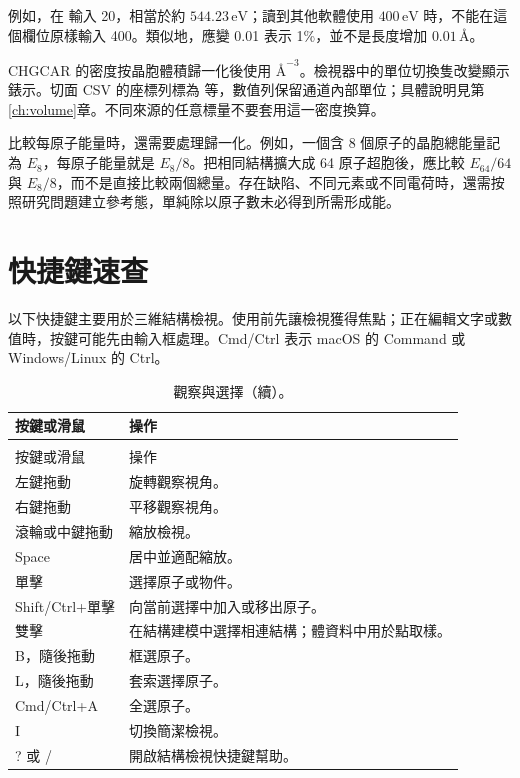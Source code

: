 例如，在  輸入 20，相當於約 $544.23\,\mathrm{eV}$；讀到其他軟體使用 $400\,\mathrm{eV}$ 時，不能在這個欄位原樣輸入 400。類似地，應變 0.01 表示 1\%，並不是長度增加 $0.01\,\text{\AA}$。

CHGCAR 的密度按晶胞體積歸一化後使用 $\text{\AA}^{-3}$。檢視器中的單位切換隻改變顯示錶示。切面 CSV 的座標列標為  等，數值列保留通道內部單位；具體說明見第\ref{ch:volume}章。不同來源的任意標量不要套用這一密度換算。

比較每原子能量時，還需要處理歸一化。例如，一個含 8 個原子的晶胞總能量記為 $E_8$，每原子能量就是 $E_8/8$。把相同結構擴大成 64 原子超胞後，應比較 $E_{64}/64$ 與 $E_8/8$，而不是直接比較兩個總量。存在缺陷、不同元素或不同電荷時，還需按照研究問題建立參考態，單純除以原子數未必得到所需形成能。

\section{快捷鍵速查}

以下快捷鍵主要用於三維結構檢視。使用前先讓檢視獲得焦點；正在編輯文字或數值時，按鍵可能先由輸入框處理。Cmd/Ctrl 表示 macOS 的 Command 或 Windows/Linux 的 Ctrl。

\begin{longtable}{>{\raggedright\arraybackslash}p{.37\linewidth}>{\raggedright\arraybackslash}p{}}
\caption{觀察與選擇。}\\
\toprule
按鍵或滑鼠 & 操作 \\
\midrule
\endfirsthead
\caption[]{觀察與選擇（續）。}\\
\toprule
按鍵或滑鼠 & 操作 \\
\midrule
\endhead
\bottomrule
\endfoot
\bottomrule
\endlastfoot
左鍵拖動 & 旋轉觀察視角。\\
右鍵拖動 & 平移觀察視角。\\
滾輪或中鍵拖動 & 縮放檢視。\\
Space & 居中並適配縮放。\\
單擊 & 選擇原子或物件。\\
Shift/Ctrl+單擊 & 向當前選擇中加入或移出原子。\\
雙擊 & 在結構建模中選擇相連結構；體資料中用於點取樣。\\
B，隨後拖動 & 框選原子。\\
L，隨後拖動 & 套索選擇原子。\\
Cmd/Ctrl+A & 全選原子。\\
I & 切換簡潔檢視。\\
? 或 / & 開啟結構檢視快捷鍵幫助。\\
\end{longtable}

